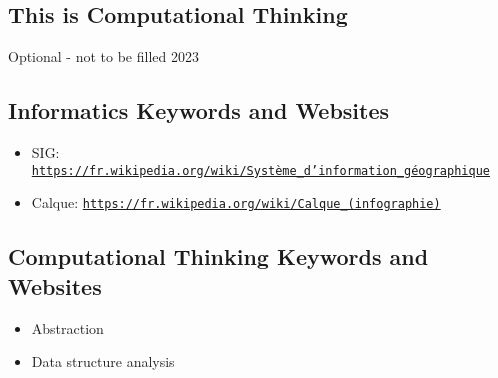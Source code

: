 \documentclass[a4paper,11pt]{report}
\newcommand{\BrochureUrlText}[1]{\texttt{#1}}
\begin{document}
\subsection*{This is Computational Thinking}

Optional - not to be filled 2023


\subsection*{Informatics Keywords and Websites}

\begin{itemize}
  \item SIG: \href{https://fr.wikipedia.org/wiki/Syst\%C3\%A8me_d\%27information_g\%C3\%A9ographique}{\BrochureUrlText{https://fr.wikipedia.org/wiki/Système\_d'information\_géographique}}
  \item Calque: \href{https://fr.wikipedia.org/wiki/Calque_(infographie)}{\BrochureUrlText{https://fr.wikipedia.org/wiki/Calque\_(infographie)}}
\end{itemize}


\subsection*{Computational Thinking Keywords and Websites}

\begin{itemize}
  \item Abstraction
  \item Data structure analysis
\end{itemize}
\end{document}
